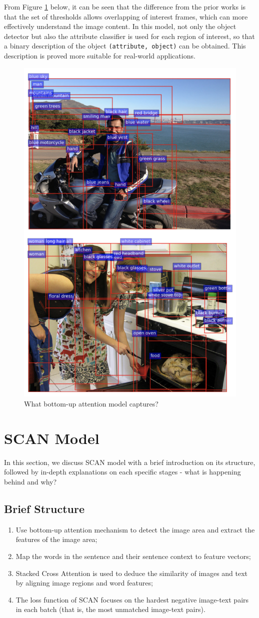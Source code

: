 From Figure \ref{fig:bottomup} below, it can be seen that the difference from the prior works is that the set of thresholds allows overlapping of interest frames, which can more effectively understand the image content. In this model, not only the object detector but also the attribute classifier is used for each region of interest, so that a binary description of the object \verb|(attribute, object)| can be obtained. This description is proved more suitable for real-world applications.

\begin{figure}[h!]
\centering
\includegraphics[width=.5\textwidth]{bottomup.pdf}
\caption{What bottom-up attention model captures? \cite{bottomup}}
\label{fig:bottomup}
\end{figure}

\section{SCAN Model}
In this section, we discuss SCAN model with a brief introduction on its structure, followed by in-depth explanations on each specific stages - what is happening behind and why?

\subsection{Brief Structure}
\begin{enumerate}
    \item Use bottom-up attention mechanism \cite{bottomup} to detect the image area and extract the features of the image area;
    \item Map the words in the sentence and their sentence context to feature vectors;
    \item Stacked Cross Attention is used to deduce the similarity of images and text by aligning image regions and word features;
    \item The loss function of SCAN focuses on the hardest negative image-text pairs in each batch (that is, the most unmatched image-text pairs).
\end{enumerate}

